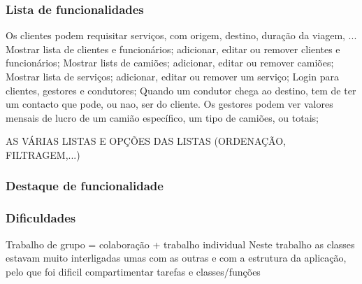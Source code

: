 \documentclass{beamer}
\def\\{}
\begin{document}
\begin{frame}
\frametitle{Lista de funcionalidades} 
Os clientes podem requisitar serviços, com origem, destino, duração da viagem, ...\\
Mostrar lista de clientes e funcionários; adicionar, editar ou remover clientes e funcionários;\\
Mostrar lists de camiões; adicionar, editar ou remover camiões; \\
Mostrar lista de serviços; adicionar, editar ou remover um serviço;\\
Login para clientes, gestores e condutores;\\
Quando um condutor chega ao destino, tem de ter um contacto que pode, ou nao, ser do cliente.\\
Os gestores podem ver valores mensais de lucro de um camião específico, um tipo de camiões, ou totais;\\
\end{frame}

\begin{frame}
AS VÁRIAS LISTAS E OPÇÕES DAS LISTAS (ORDENAÇÃO, FILTRAGEM,...)
\end{frame}

\begin{frame}
\frametitle{Destaque de funcionalidade}
\end{frame}

\begin{frame}
\frametitle{Dificuldades}
Trabalho de grupo = colaboração + trabalho individual\\
Neste trabalho as classes estavam muito interligadas umas com as outras e com a estrutura da aplicação, pelo que foi dificil compartimentar tarefas e classes/funções
\end{frame}
\end{document}
